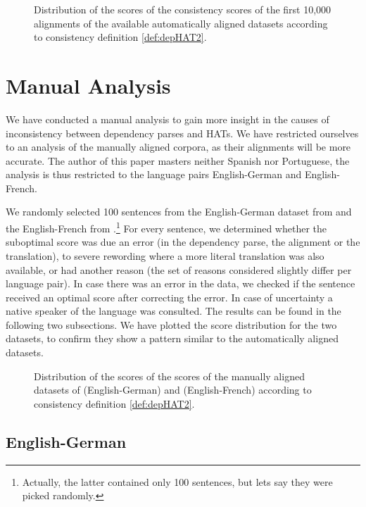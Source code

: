 \begin{figure}[!ht]

\caption{Distribution of the scores of the consistency scores of the first 10,000 alignments of the available automatically aligned datasets according to consistency definition \ref{def:depHAT2}.}\label{fig:scoredstrib}
\end{figure}

\section{Manual Analysis}
\label{sec:man}

We have conducted a manual analysis to gain more insight in the causes of inconsistency between dependency parses and HATs. We have restricted ourselves to an analysis of the manually aligned corpora, as their alignments will be more accurate. The author of this paper masters neither Spanish nor Portuguese, the analysis is thus restricted to the language pairs English-German and English-French.

We randomly selected 100 sentences from the English-German dataset from \cite{pado2006optimal} and the English-French from \cite{graca2008building}.\footnote{Actually, the latter contained only 100 sentences, but lets say they were picked randomly.} For every sentence, we determined whether the suboptimal score was due an error (in the dependency parse, the alignment or the translation), to severe rewording where a more literal translation was also available, or had another reason (the set of reasons considered slightly differ per language pair). In case there was an error in the data, we checked if the sentence received an optimal score after correcting the error. In case of uncertainty a native speaker of the language was consulted. The results can be found in the following two subsections. We have plotted the score distribution for the two datasets, to confirm they show a pattern similar to the automatically aligned datasets.

\begin{figure}[!ht]

\caption{Distribution of the scores of the scores of the manually aligned datasets of \cite{pado2006optimal} (English-German) and \cite{graca2008building} (English-French) according to consistency definition \ref{def:depHAT2}.}\label{fig:scoredstrib2}
\end{figure}

\subsection{English-German}

